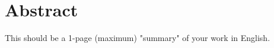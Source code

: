 \chapter{Abstract}


\begin{english} %
This should be a 1-page (maximum) "summary" of your work in English.
\end{english}

